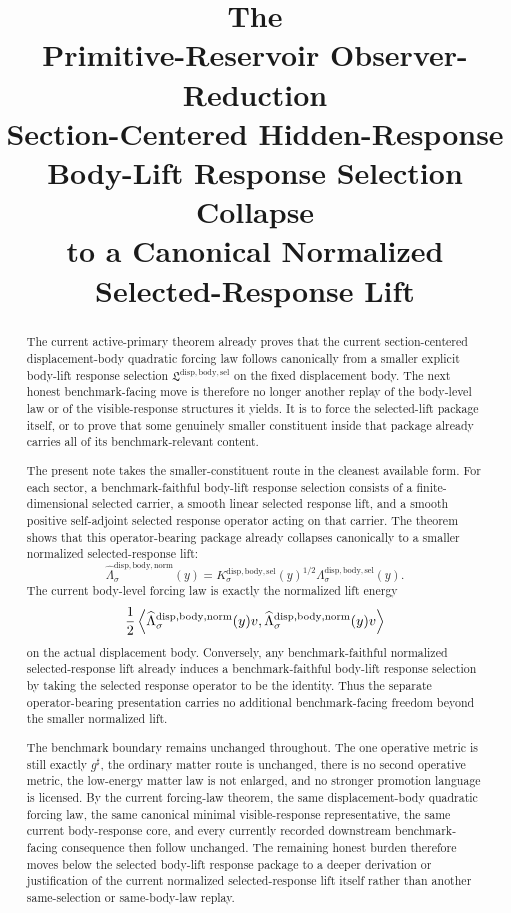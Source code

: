 \documentclass[11pt]{article}
\title{\textbf{The \TheoryName{}}\\[0.4em]
\large Primitive-Reservoir Observer-Reduction\\
\large Section-Centered Hidden-Response\\
\large Body-Lift Response Selection Collapse\\
\large to a Canonical Normalized\\
\large Selected-Response Lift}
\author{}
\date{}
\newcommand{\CompletedMetric}{g^{\sharp}}
\newcommand{\LiftSelectionPackage}{\mathfrak L^{\mathrm{disp,body,sel}}}
\newcommand{\SelectedResponseLift}[1]{\Lambda_{#1}^{\mathrm{disp,body,sel}}}
\newcommand{\SelectedResponseOperator}[1]{K_{#1}^{\mathrm{disp,body,sel}}}
\newcommand{\NormalizedSelectedResponseLift}[1]{\widehat{\Lambda}_{#1}^{\mathrm{disp,body,norm}}}
\begin{document}
\maketitle

\begin{abstract}
The current active-primary theorem already proves that the current section-centered displacement-body quadratic forcing law follows canonically from a smaller explicit body-lift response selection \(\LiftSelectionPackage\) on the fixed displacement body. The next honest benchmark-facing move is therefore no longer another replay of the body-level law or of the visible-response structures it yields. It is to force the selected-lift package itself, or to prove that some genuinely smaller constituent inside that package already carries all of its benchmark-relevant content.

The present note takes the smaller-constituent route in the cleanest available form. For each sector, a benchmark-faithful body-lift response selection consists of a finite-dimensional selected carrier, a smooth linear selected response lift, and a smooth positive self-adjoint selected response operator acting on that carrier. The theorem shows that this operator-bearing package already collapses canonically to a smaller normalized selected-response lift:
\[
\NormalizedSelectedResponseLift{\sigma}(y)
=
\SelectedResponseOperator{\sigma}(y)^{1/2}\SelectedResponseLift{\sigma}(y).
\]
The current body-level forcing law is exactly the normalized lift energy
\[
\frac{1}{2}
\ev{
\NormalizedSelectedResponseLift{\sigma}(y)v,
\NormalizedSelectedResponseLift{\sigma}(y)v
}
\]
on the actual displacement body. Conversely, any benchmark-faithful normalized selected-response lift already induces a benchmark-faithful body-lift response selection by taking the selected response operator to be the identity. Thus the separate operator-bearing presentation carries no additional benchmark-facing freedom beyond the smaller normalized lift.

The benchmark boundary remains unchanged throughout. The one operative metric is still exactly \(\CompletedMetric\), the ordinary matter route is unchanged, there is no second operative metric, the low-energy matter law is not enlarged, and no stronger promotion language is licensed. By the current forcing-law theorem, the same displacement-body quadratic forcing law, the same canonical minimal visible-response representative, the same current body-response core, and every currently recorded downstream benchmark-facing consequence then follow unchanged. The remaining honest burden therefore moves below the selected body-lift response package to a deeper derivation or justification of the current normalized selected-response lift itself rather than another same-selection or same-body-law replay.
\end{abstract}
\end{document}

